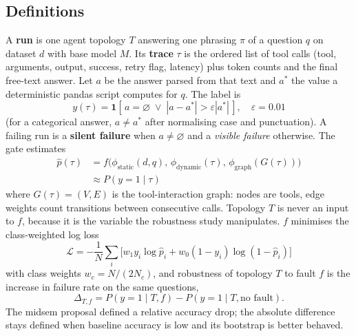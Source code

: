 \documentclass[10pt,twocolumn]{article}
\newcommand{\SF}{\textcolor{sfred}{\textbf{silent failure}}}
\begin{document}
\subsection{Definitions}
A \textbf{run} is one agent topology $T$ answering one phrasing $\pi$ of a question $q$ on dataset $d$ with base
model $M$. Its \textbf{trace} $\tau$ is the ordered list of tool calls (tool, arguments, output, success, retry flag,
latency) plus token counts and the final free-text answer. Let $a$ be the answer parsed from that text and $a^*$
the value a deterministic pandas script computes for $q$. The label is
\begin{equation}
  y(\tau) = \mathbf{1}\left[\, a = \varnothing \;\lor\; |a - a^*| > \varepsilon |a^*| \,\right],
  \quad \varepsilon = 0.01
\end{equation}
(for a categorical answer, $a \neq a^*$ after normalising case and punctuation). A failing run is a \SF{} when
$a \neq \varnothing$ and a \emph{visible failure} otherwise. The gate estimates
\begin{equation}
  \begin{aligned}
  \hat{p}(\tau) &= f\big(\phi_{\text{static}}(d,q),\, \phi_{\text{dynamic}}(\tau),\,
  \phi_{\text{graph}}(G(\tau))\big)\\ &\approx P(y = 1 \mid \tau)
  \end{aligned}
\end{equation}
where $G(\tau) = (V, E)$ is the tool-interaction graph: nodes are tools, edge weights count transitions between
consecutive calls. Topology $T$ is never an input to $f$, because it is the variable the robustness study
manipulates. $f$ minimises the class-weighted log loss
\begin{equation}
  \mathcal{L} = -\frac{1}{N}\sum_i \big[w_1 y_i \log \hat{p}_i + w_0 (1-y_i)\log(1-\hat{p}_i)\big]
\end{equation}
with class weights $w_c = N / (2N_c)$, and robustness of topology $T$ to fault $f$ is the increase in failure rate on the same questions,
\begin{equation}
  \Delta_{T,f} = P(y = 1 \mid T, f) - P(y = 1 \mid T, \text{no fault}).
\end{equation}
The midsem proposal defined a relative accuracy drop; the absolute difference stays defined when baseline accuracy
is low and its bootstrap is better behaved.
\end{document}
